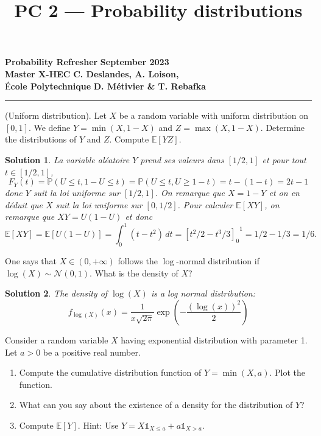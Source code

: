 \documentclass{article}
\title{PC 2 --- Probability distributions}
\author{}
\date{}
\newtheorem{solution}{Solution}
\begin{document}
\begin{flushleft}
  \textbf{Probability Refresher} \hfill \textbf{September 2023} \\
  \textbf{Master X-HEC} \hfill \textbf{C. Deslandes, A. Loison,} \\
  É\textbf{cole Polytechnique} \hfill \textbf{D. Métivier \& T. Rebafka}
\end{flushleft}

{\let\newpage\relax\maketitle}
\vspace{-1.3cm}
\hrule

\vspace{0.5cm}

\begin{Exercise} (Uniform distribution). Let $X$ be a random variable with uniform distribution on $[0,1]$. We define $Y=\min (X, 1-X)$ and $Z=\max (X, 1-X)$. Determine the distributions of $Y$ and $Z$. Compute $\mathbb{E}[Y Z]$.
\end{Exercise}

\begin{solution}
  La variable al\'{e}atoire $Y$ prend ses valeurs dans $[1/2,1]$ et pour tout $t\in[1/2,1]$,
  \[
    F_Y(t) = \mathbb{P}(U\leq t,1-U\leq t) = \mathbb{P}(U\leq t,U\geq 1-t)
    = t - (1-t) = 2t-1
  \]
  donc $Y$ suit la loi uniforme sur $[1/2,1]$. On remarque que $X = 1-Y$ et on en
  d\'{e}duit que $X$ suit la loi uniforme sur $[0,1/2]$. Pour calculer
  $\mathbb{E}[XY]$, on remarque que $XY = U(1-U)$ et donc
  \[
    \mathbb{E}[XY]
    = \mathbb{E}[U(1-U)]
    = \int_0^{1}\!(t-t^2)\,dt
      = {{[t^2/2-t^3/3]}_0}^{1}
    = 1/2-1/3=1/6.
  \]
\end{solution}

\begin{Exercise}
  One says that $X \in (0,+\infty)$ follows the $\log$-normal distribution if $\log (X) \sim \mathcal{N}(0,1)$. What is the density of $X$?
\end{Exercise}

\begin{solution}
  The density of $\log (X)$ is a log normal distribution:
  \[ f_{\log (X)}(x) = \frac{1}{x\sqrt{2\pi}} \exp{\left( -\frac{{(\log(x))}^2}{2} \right)} \]
\end{solution}

\begin{Exercise}
  Consider a random variable $X$ having exponential distribution with parameter 1. Let $a>0$ be a positive real number.
  \begin{enumerate}
    \item Compute the cumulative distribution function of $Y=\min (X, a)$. Plot the
          function.

    \item What can you say about the existence of a density for the distribution of $Y$?

    \item Compute $\mathbb{E}[Y]$. Hint: Use $Y=X \mathbb{1}_{X \leq a}+a
            \mathbb{1}_{X>a}$.
  \end{enumerate}
\end{Exercise}
\end{document}
